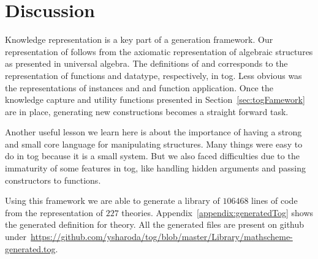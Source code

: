 

\section{Discussion}
\label{sec:generation:discussion}

Knowledge representation is a key part of a generation framework. Our representation of  follows from the axiomatic representation of algebraic structures as presented in universal algebra. The definitions of  and  corresponds to the representation of functions and datatype, respectively, in tog. Less obvious was the representations of instances  and  and function application. 
Once the knowledge capture and utility functions presented in Section~\ref{sec:togFamework} are in place, generating new constructions becomes a straight forward task. 

Another useful lesson we learn here is about the importance of having a strong and small core language for manipulating structures. Many things were easy to do in tog because it is a small system. But we also faced difficulties due to the immaturity of some features in tog, like handling hidden arguments and passing constructors to functions. 

Using this framework we are able to generate a library of $106468$ lines of code from the representation of $227$ theories. Appendix~\ref{appendix:generatedTog} shows the generated definition for  theory. All the generated files are present on github under~\url{https://github.com/ysharoda/tog/blob/master/Library/mathscheme-generated.tog}. 
 
